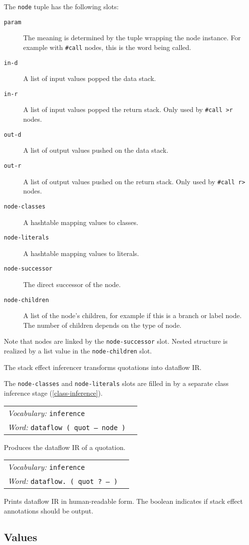 \documentclass{book}
\newcommand{\vocabulary}[1]{\emph{Vocabulary:} \texttt{#1}&\\}
\newcommand{\ordinaryword}[2]{\index{\texttt{#1}}\emph{Word:} \texttt{#2}&\\}
\newcommand{\wordtable}[1]{


\begin{tabularx}{12cm}{lX}
\hline
#1
\hline
\end{tabularx}

}
\begin{document}
The \verb|node| tuple has the following slots:

\begin{description}
\item[\texttt{param}] The meaning is determined by the tuple wrapping the node instance. For example with \verb|#call| nodes, this is the word being called.
\item[\texttt{in-d}] A list of input values popped the data stack.
\item[\texttt{in-r}] A list of input values popped the return stack. Only used by \verb|#call >r| nodes.
\item[\texttt{out-d}] A list of output values pushed on the data stack.
\item[\texttt{out-r}] A list of output values pushed on the return stack. Only used by \verb|#call r>| nodes.
\item[\texttt{node-classes}] A hashtable mapping values to classes.
\item[\texttt{node-literals}] A hashtable mapping values to literals.
\item[\texttt{node-successor}] The direct successor of the node.
\item[\texttt{node-children}] A list of the node's children, for example if this is a branch or label node. The number of children depends on the type of node.
\end{description}

Note that nodes are linked by the \verb|node-successor| slot. Nested structure is realized by a list value in the \verb|node-children| slot.

The stack effect inferencer transforms quotations into dataflow IR.

The \verb|node-classes| and \verb|node-literals| slots are filled in by a separate class inference stage (\ref{class-inference}).

\wordtable{
\vocabulary{inference}
\ordinaryword{dataflow}{dataflow ( quot -- node )}
}

Produces the dataflow IR of a quotation.

\wordtable{
\vocabulary{inference}
\ordinaryword{dataflow.}{dataflow.~( quot ? -- )}
}

Prints dataflow IR in human-readable form. The boolean indicates if stack effect annotations should be output.

\subsection{Values}
\end{document}
